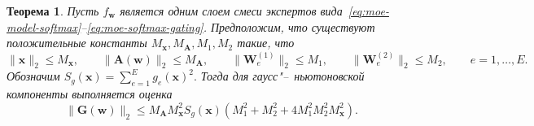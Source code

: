 \documentclass[11pt]{extarticle}
\newtheorem{theorem}{Теорема}
\theoremstyle{definition}
\theoremstyle{plain}
\theoremstyle{remark}
\begin{document}
\begin{theorem}
\label{thm:moe-softmax-G-bound-improved}
Пусть $f_{\mathbf w}$ является одним слоем смеси экспертов вида~\eqref{eq:moe-model-softmax}--\eqref{eq:moe-softmax-gating}. Предположим, что существуют положительные константы $M_{\mathbf x}, M_{\mathbf A}, M_1, M_2$ такие, что
\begin{equation}
    \label{eq:moe-softmax-assumptions}
    \|\mathbf x\|_2 \le M_{\mathbf x},
    \qquad
    \|\mathbf A(\mathbf w)\|_2 \le M_{\mathbf A},
    \qquad
    \|\mathbf W_e^{(1)}\|_2 \le M_1,
    \qquad
    \|\mathbf W_e^{(2)}\|_2 \le M_2,
    \qquad e=1,\dots,E.
\end{equation}
Обозначим
$
    S_g(\mathbf x)=\sum\limits_{e=1}^{E}g_e(\mathbf x)^2.
$
Тогда для гаусс"--~ньютоновской компоненты выполняется оценка
\begin{equation}
    \label{eq:moe-softmax-G-bound}
    \|\mathbf G(\mathbf w)\|_2
    \le
    M_{\mathbf A}M_{\mathbf x}^2S_g(\mathbf x)
    \left(
        M_1^2+M_2^2+4M_1^2M_2^2M_{\mathbf x}^2
    \right).
\end{equation}
\end{theorem}
\end{document}
